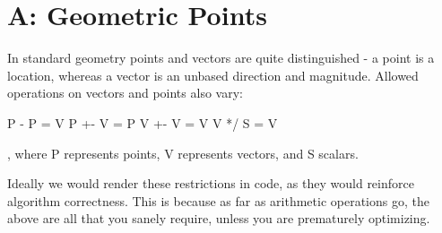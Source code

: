 \section{A: Geometric Points}
In standard geometry points and vectors are quite distinguished - a  
point is a location, whereas a vector is an unbased direction and
magnitude.  Allowed operations on vectors and points also vary:

P  - P = V
P +- V = P
V +- V = V
V */ S = V

, where P represents points, V represents vectors, and S scalars.

Ideally we would render these restrictions in code, as they would
reinforce algorithm correctness.  This is because as far as arithmetic
operations go, the above are all that you sanely require, unless you
are prematurely optimizing.


